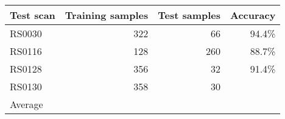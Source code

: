 \begin{tabular}{@{}lrrr@{}}
\toprule
Test scan & Training samples & Test samples & Accuracy \\ \midrule
RS0030    & 322              & 66           & 94.4\%   \\
RS0116    & 128              & 260          & 88.7\%   \\
RS0128    & 356              & 32           & 91.4\%   \\
RS0130    & 358              & 30           &          \\ \midrule
Average   &                  &              &          \\ \bottomrule
\end{tabular}